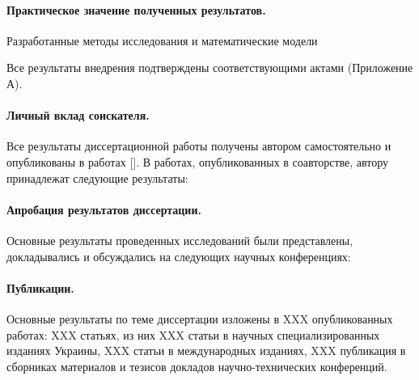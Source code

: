 \paragraph{Практическое значение полученных результатов.}
Разработанные методы исследования и математические модели

Все результаты внедрения подтверждены соответствующими актами
(Приложение А).

\paragraph{Личный вклад соискателя.} Все результаты диссертационной работы
получены автором самостоятельно и опубликованы в работах [].
В работах, опубликованных в соавторстве, автору
принадлежат следующие результаты:


\paragraph{Апробация результатов диссертации.}
Основные результаты проведенных исследований были представлены, докладывались и
обсуждались на следующих научных конференциях:

\paragraph{Публикации.}
Основные результаты по теме диссертации изложены в XXX
опубликованных работах: XXX статьях, из них XXX статьи в научных
специализированных изданиях Украины, XXX статьи в международных изданиях,
XXX публикация в сборниках материалов и тезисов докладов научно-технических
конференций.



